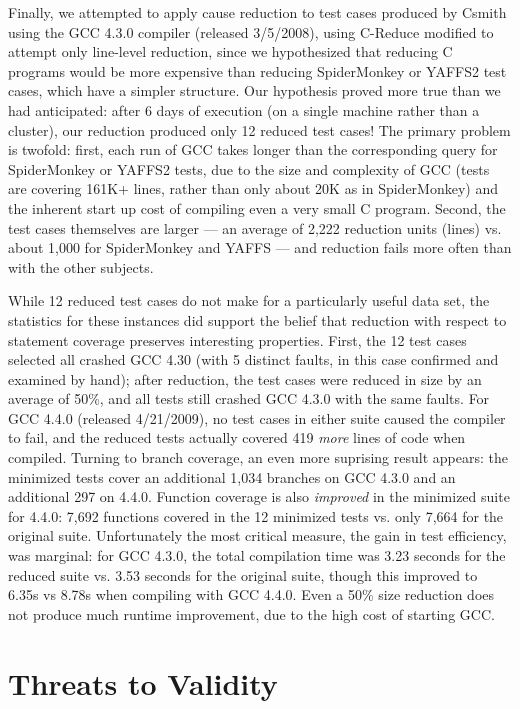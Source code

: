 Finally, we attempted to apply cause reduction to test cases produced
by Csmith \cite{csmith} using the GCC 4.3.0 compiler (released
3/5/2008), using C-Reduce \cite{CReduce} modified to attempt only
line-level reduction, since we hypothesized that reducing C programs
would be more expensive than reducing SpiderMonkey or YAFFS2 test
cases, which have a simpler structure.  Our hypothesis proved more
true than we had anticipated: after 6 days of execution (on a single
machine rather than a cluster), our reduction produced only 12 reduced
test cases!  The primary problem is twofold: first, each run of GCC
takes longer than the corresponding query for SpiderMonkey or YAFFS2
tests, due to the size and complexity of GCC (tests are covering 161K+
lines, rather than only about 20K as in SpiderMonkey) and the inherent
start up cost of compiling even a very small C program.  Second, the
test cases themselves are larger --- an average of 2,222 reduction
units (lines) vs. about 1,000 for SpiderMonkey and YAFFS --- and
reduction fails more often than with the other subjects.

While 12 reduced test cases do not make for a particularly useful data
set, the statistics for these instances did support the belief that
reduction with respect to statement coverage preserves interesting
properties.  First, the 12 test cases selected all crashed GCC 4.30
(with 5 distinct faults, in this case confirmed and examined by hand);
after reduction, the test cases were reduced in size by an average of
50\%, and all tests still crashed GCC 4.3.0 with the same faults.  For
GCC 4.4.0 (released 4/21/2009), no test cases in either suite caused
the compiler to fail, and the reduced tests actually covered 419
\emph{more} lines of code when compiled. Turning to branch coverage,
an even more suprising result appears: the minimized tests cover an
additional 1,034 branches on GCC 4.3.0 and an additional 297 on 4.4.0.
Function coverage is also \emph{improved} in the minimized suite for
4.4.0: 7,692 functions covered in the 12 minimized tests vs. only
7,664 for the original suite.  Unfortunately the most critical
measure, the gain in test efficiency, was marginal: for GCC 4.3.0, the
total compilation time was 3.23 seconds for the reduced suite vs. 3.53
seconds for the original suite, though this improved to 6.35s vs 8.78s
when compiling with GCC 4.4.0. Even a 50\% size reduction does not
produce much runtime improvement, due to the high cost of starting
GCC.

\section{Threats to Validity}

